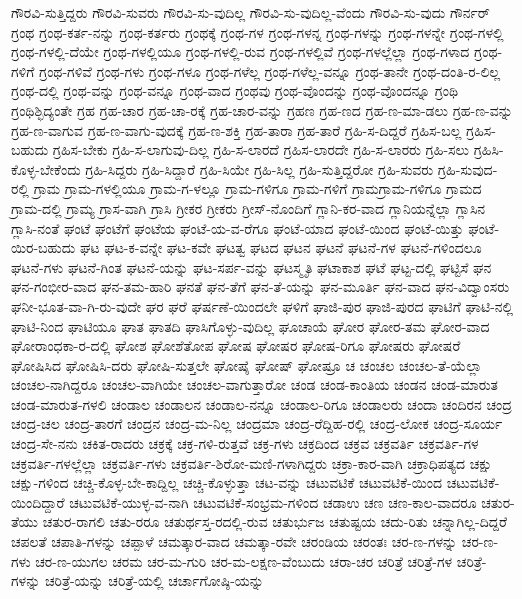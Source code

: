 {ಗೌರವಿ-ಸುತ್ತಿದ್ದರು
ಗೌರವಿ-ಸುವರು
ಗೌರವಿ-ಸು-ವುದಿಲ್ಲ
ಗೌರವಿ-ಸು-ವುದಿಲ್ಲ-ವೆಂದು
ಗೌರವಿ-ಸು-ವುದು
ಗೌರ್ನರ್
ಗ್ರಂಥ
ಗ್ರಂಥ-ಕರ್ತ-ನನ್ನು
ಗ್ರಂಥ-ಕರ್ತರು
ಗ್ರಂಥಕ್ಕೆ
ಗ್ರಂಥ-ಗಳ
ಗ್ರಂಥ-ಗಳನ್ನ
ಗ್ರಂಥ-ಗಳನ್ನು
ಗ್ರಂಥ-ಗಳನ್ನೇ
ಗ್ರಂಥ-ಗಳಲ್ಲಿ
ಗ್ರಂಥ-ಗಳಲ್ಲಿ-ದೆಯೇ
ಗ್ರಂಥ-ಗಳಲ್ಲಿಯೂ
ಗ್ರಂಥ-ಗಳಲ್ಲಿ-ರುವ
ಗ್ರಂಥ-ಗಳಲ್ಲಿವೆ
ಗ್ರಂಥ-ಗಳಲ್ಲೆಲ್ಲಾ
ಗ್ರಂಥ-ಗಳಾದ
ಗ್ರಂಥ-ಗಳಿಗೆ
ಗ್ರಂಥ-ಗಳಿವೆ
ಗ್ರಂಥ-ಗಳು
ಗ್ರಂಥ-ಗಳೂ
ಗ್ರಂಥ-ಗಳೆಲ್ಲ
ಗ್ರಂಥ-ಗಳೆಲ್ಲ-ವನ್ನೂ
ಗ್ರಂಥ-ತಾನೇ
ಗ್ರಂಥ-ದಂತಿ-ರ-ಲಿಲ್ಲ
ಗ್ರಂಥ-ದಲ್ಲಿ
ಗ್ರಂಥ-ವನ್ನು
ಗ್ರಂಥ-ವನ್ನೂ
ಗ್ರಂಥ-ವಾದ
ಗ್ರಂಥವು
ಗ್ರಂಥ-ವೊಂದನ್ನು
ಗ್ರಂಥ-ವೊಂದನ್ನೂ
ಗ್ರಂಥಿ
ಗ್ರಂಥಿಶ್ಛಿದ್ಯಂತೇ
ಗ್ರಹ
ಗ್ರಹ-ಚಾರ
ಗ್ರಹ-ಚಾ-ರಕ್ಕೆ
ಗ್ರಹ-ಚಾರ-ವನ್ನು
ಗ್ರಹಣ
ಗ್ರಹ-ಣದ
ಗ್ರಹ-ಣ-ಮಾ-ಡಲು
ಗ್ರಹ-ಣ-ವನ್ನು
ಗ್ರಹ-ಣ-ವಾಗುವ
ಗ್ರಹ-ಣ-ವಾಗು-ವುದಕ್ಕೆ
ಗ್ರಹ-ಣ-ಶಕ್ತಿ
ಗ್ರಹ-ತಾರಾ
ಗ್ರಹ-ತಾರೆ
ಗ್ರಹಿ-ಸ-ದಿದ್ದರೆ
ಗ್ರಹಿಸ-ಬಲ್ಲ
ಗ್ರಹಿಸ-ಬಹುದು
ಗ್ರಹಿಸ-ಬೇಕು
ಗ್ರಹಿ-ಸ-ಲಾಗುವು-ದಿಲ್ಲ
ಗ್ರಹಿ-ಸ-ಲಾರದೆ
ಗ್ರಹಿಸ-ಲಾರದೇ
ಗ್ರಹಿ-ಸ-ಲಾರರು
ಗ್ರಹಿ-ಸಲು
ಗ್ರಹಿಸಿ-ಕೊಳ್ಳ-ಬೇಕೆಂದು
ಗ್ರಹಿ-ಸಿದ್ದರು
ಗ್ರಹಿ-ಸಿದ್ದಾರೆ
ಗ್ರಹಿ-ಸಿಯೇ
ಗ್ರಹಿ-ಸಿಲ್ಲ
ಗ್ರಹಿ-ಸುತ್ತಿದ್ದರೋ
ಗ್ರಹಿ-ಸುವರು
ಗ್ರಹಿ-ಸುವುದ-ರಲ್ಲಿ
ಗ್ರಾಮ
ಗ್ರಾಮ-ಗಳಲ್ಲಿಯೂ
ಗ್ರಾಮ-ಗ-ಳಲ್ಲೂ
ಗ್ರಾಮ-ಗಳಿಗೂ
ಗ್ರಾಮ-ಗಳಿಗೆ
ಗ್ರಾಮಗ್ರಾಮ-ಗಳಿಗೂ
ಗ್ರಾಮದ
ಗ್ರಾಮ-ದಲ್ಲಿ
ಗ್ರಾಮ್ಯ
ಗ್ರಾಸ-ವಾಗಿ
ಗ್ರಾಸಿ
ಗ್ರೀಕರ
ಗ್ರೀಕರು
ಗ್ರೀಸ್-ನೊಂದಿಗೆ
ಗ್ಲಾನಿ-ಕರ-ವಾದ
ಗ್ಲಾನಿಯನ್ನೆಲ್ಲಾ
ಗ್ಲಾಸಿನ
ಗ್ಲಾಸಿ-ನಂತೆ
ಘಂಟೆ
ಘಂಟೆಗೆ
ಘಂಟೆಯ
ಘಂಟೆ-ಯ-ವ-ರೆಗೂ
ಘಂಟೆ-ಯಾದ
ಘಂಟೆ-ಯಿಂದ
ಘಂಟೆ-ಯಿತ್ತು
ಘಂಟೆ-ಯಿರ-ಬಹುದು
ಘಟ
ಘಟ-ಕ-ವನ್ನೇ
ಘಟ-ಕವೇ
ಘಟತ್ವ
ಘಟದ
ಘಟನ
ಘಟನೆ
ಘಟನೆ-ಗಳ
ಘಟನೆ-ಗಳಿಂದಲೂ
ಘಟನೆ-ಗಳು
ಘಟನೆ-ಗಿಂತ
ಘಟನೆ-ಯನ್ನು
ಘಟ-ಸರ್ಪ-ವನ್ನು
ಘಟಸ್ಮೃತಿ
ಘಟಾಕಾಶ
ಘಟೆ
ಘಟ್ಟ-ದಲ್ಲಿ
ಘಟ್ಟಿಸೆ
ಘನ
ಘನ-ಗಂಭೀರ-ವಾದ
ಘನ-ತಮ-ಹಾರಿ
ಘನತೆ
ಘನ-ತೆಗೆ
ಘನ-ತೆ-ಯನ್ನು
ಘನ-ಮೂರ್ತಿ
ಘನ-ವಾದ
ಘನ-ವಿದ್ವಾಂಸರು
ಘನೀ-ಭೂತ-ವಾ-ಗಿ-ರು-ವುದೇ
ಘರ
ಘರೆ
ಘರ್ಷಣೆ-ಯಿಂದಲೇ
ಘಳಿಗೆ
ಘಾಜಿ-ಪುರ
ಘಾಜಿ-ಪುರದ
ಘಾಟಿಗೆ
ಘಾಟಿ-ನಲ್ಲಿ
ಘಾಟಿ-ನಿಂದ
ಘಾಟಿಯೂ
ಘಾತ
ಘಾತದಿ
ಘಾಸಿಗೊಳ್ಳು-ವುದಿಲ್ಲ
ಘೂಚಾಯೆ
ಘೋರ
ಘೋರ-ತಮ
ಘೋರ-ವಾದ
ಘೋರಾಂಧಕಾ-ರ-ದಲ್ಲಿ
ಘೋಶ
ಘೋಶೆತೋಪ
ಘೋಷ
ಘೋಷರ
ಘೋಷ-ರಿಗೂ
ಘೋಷರು
ಘೋಷರೆ
ಘೋಷಿಸಿದ
ಘೋಷಿಸಿ-ದರು
ಘೋಷಿ-ಸುತ್ತಲೇ
ಘೋಷೈ
ಘೋಷ್
ಘೋಷ್ರೂ
ಚ
ಚಂಚಲ
ಚಂಚಲ-ತೆ-ಯೆಲ್ಲಾ
ಚಂಚಲ-ನಾಗಿದ್ದರೂ
ಚಂಚಲ-ವಾಗಿಯೇ
ಚಂಚಲ-ವಾಗುತ್ತಾರೋ
ಚಂಡ
ಚಂಡ-ಕಾಂತಿಯ
ಚಂಡನ
ಚಂಡ-ಮಾರುತ
ಚಂಡ-ಮಾರುತ-ಗಳಲಿ
ಚಂಡಾಲ
ಚಂಡಾಲನ
ಚಂಡಾಲ-ನನ್ನೂ
ಚಂಡಾಲ-ರಿಗೂ
ಚಂಡಾಲರು
ಚಂದಾ
ಚಂದಿರನ
ಚಂದ್ರ
ಚಂದ್ರ-ಚಲ
ಚಂದ್ರ-ತಾರಗೆ
ಚಂದ್ರನ
ಚಂದ್ರ-ಮ-ನಿಲ್ಲ
ಚಂದ್ರಮಾ
ಚಂದ್ರ-ರೆದ್ದಿಹ-ರಲ್ಲಿ
ಚಂದ್ರ-ಲೋಕ
ಚಂದ್ರ-ಸೂರ್ಯ
ಚಂದ್ರ-ಸೇ-ನನು
ಚಕಿತ-ರಾದರು
ಚಕ್ರಕ್ಕೆ
ಚಕ್ರ-ಗಳಿ-ರುತ್ತವೆ
ಚಕ್ರ-ಗಳು
ಚಕ್ರದಿಂದ
ಚಕ್ರವ
ಚಕ್ರವರ್ತಿ
ಚಕ್ರವರ್ತಿ-ಗಳ
ಚಕ್ರವರ್ತಿ-ಗಳಲ್ಲೆಲ್ಲಾ
ಚಕ್ರವರ್ತಿ-ಗಳು
ಚಕ್ರವರ್ತಿ-ಶಿರೋ-ಮಣಿ-ಗಳಾಗಿದ್ದರು
ಚಕ್ರಾ-ಕಾರ-ವಾಗಿ
ಚಕ್ರಾಧಿಪತ್ಯದ
ಚಕ್ಷು
ಚಕ್ಷು-ಗಳಿಂದ
ಚಚ್ಚಿ-ಕೊಳ್ಳ-ಬೇ-ಕಾದ್ದಿಲ್ಲ
ಚಚ್ಚಿ-ಕೊಳ್ಳುತ್ತಾ
ಚಟ-ವನ್ನು
ಚಟುವಟಿಕೆ
ಚಟುವಟಿಕೆ-ಯಿಂದ
ಚಟುವಟಿಕೆ-ಯಿಂದಿದ್ದಾರೆ
ಚಟುವಟಿಕೆ-ಯುಳ್ಳ-ವ-ನಾಗಿ
ಚಟುವಟಿಕೆ-ಸಂಭ್ರಮ-ಗಳಿಂದ
ಚಡಾಉ
ಚಣ
ಚಣ-ಕಾಲ-ವಾದರೂ
ಚತುರ-ತೆಯು
ಚತುರ-ರಾಗಲಿ
ಚತು-ರರೂ
ಚತುರ್ಥಸ್ತ-ರದಲ್ಲಿ-ರುವ
ಚತುರ್ಭುಜ
ಚತುಷ್ಟಯ
ಚದು-ರಿತು
ಚನ್ನಾಗಿಲ್ಲ-ದಿದ್ದರೆ
ಚಪಲತೆ
ಚಪಾತಿ-ಗಳನ್ನು
ಚಪ್ಪಾಳೆ
ಚಮತ್ಕಾರ-ವಾದ
ಚಮತ್ಕಾ-ರವೇ
ಚರಂಡಿಯ
ಚರಂತಃ
ಚರ-ಣ-ಗಳನ್ನು
ಚರ-ಣ-ಗಳು
ಚರ-ಣ-ಯುಗಲ
ಚರಮ
ಚರ-ಮ-ಗುರಿ
ಚರ-ಮ-ಲಕ್ಷಣ-ವೆಂಬುದು
ಚರಾ-ಚರ
ಚರಿತ್ರೆ
ಚರಿತ್ರೆ-ಗಳ
ಚರಿತ್ರೆ-ಗಳನ್ನು
ಚರಿತ್ರೆ-ಯನ್ನು
ಚರಿತ್ರೆ-ಯಲ್ಲಿ
ಚರ್ಚಾಗೋಷ್ಠಿ-ಯನ್ನು
}
